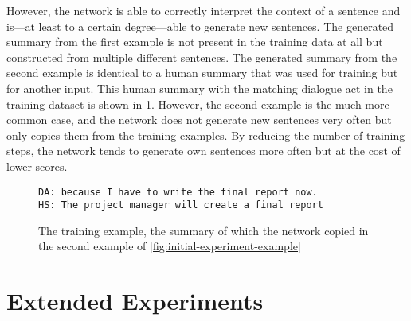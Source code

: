 However, the network is able to correctly interpret the context of a sentence and is---at least to a certain degree---able to generate new sentences.
The generated summary from the first example is not present in the training data at all but constructed from multiple different sentences.
The generated summary from the second example is identical to a human summary that was used for training but for another input.
This human summary with the matching dialogue act in the training dataset is shown in \cref{fig:initial-experiment-training-example}.
However, the second example is the much more common case, and the network does not generate new sentences very often but only copies them from the training examples.
By reducing the number of training steps, the network tends to generate own sentences more often but at the cost of lower scores.

\begin{figure}[h]
\begin{lstlisting}[numbers=none]
DA: because I have to write the final report now.
HS: The project manager will create a final report
\end{lstlisting}
\caption{The training example, the summary of which the network copied in the second example of \cref{fig:initial-experiment-example}}
\label{fig:initial-experiment-training-example}
\end{figure}


\section{Extended Experiments}

